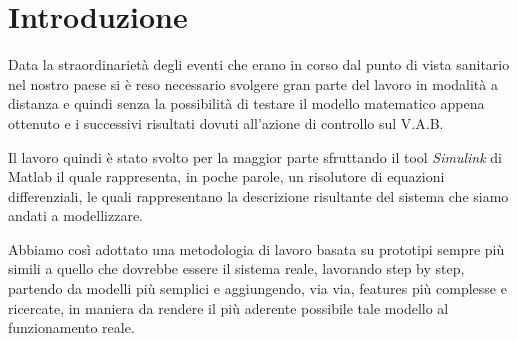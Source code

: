 \section{Introduzione}
Data la straordinarietà degli eventi che erano in corso dal punto di vista sanitario nel nostro paese si è reso necessario svolgere gran parte del lavoro in modalità a distanza e quindi senza la possibilità di testare il modello matematico appena ottenuto e i successivi risultati dovuti all'azione di controllo sul V.A.B.

Il lavoro quindi è stato svolto per la maggior parte sfruttando il tool \textit{Simulink} di Matlab il quale rappresenta, in poche parole, un risolutore di equazioni differenziali, le quali rappresentano la descrizione risultante del sistema che siamo andati a modellizzare.

Abbiamo così adottato una metodologia di lavoro basata su prototipi sempre più simili a quello che dovrebbe essere il sistema reale, lavorando step by step, partendo da modelli più semplici e aggiungendo, via via, features più complesse e ricercate, in maniera da rendere il più aderente possibile tale modello al funzionamento reale.

